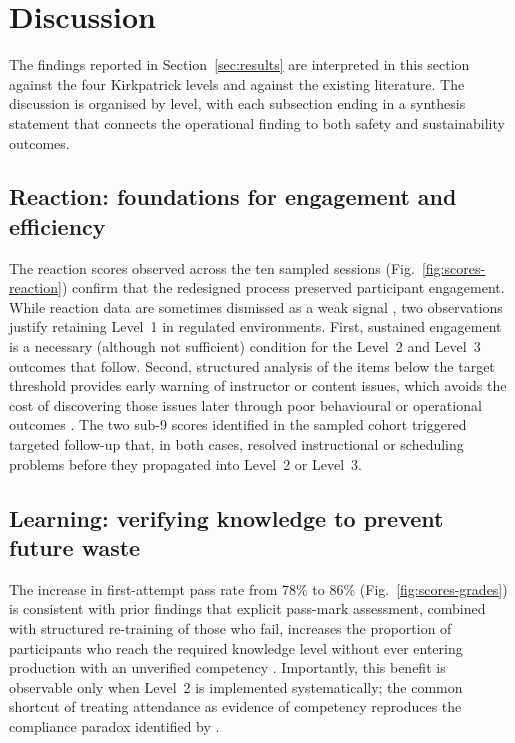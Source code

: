 \section{Discussion}
\label{sec:discussion}

The findings reported in Section~\ref{sec:results} are interpreted in this
section against the four Kirkpatrick levels and against the existing
literature. The discussion is organised by level, with each subsection
ending in a synthesis statement that connects the operational finding to
both safety and sustainability outcomes.

\subsection{Reaction: foundations for engagement and efficiency}
\label{subsec:disc-reaction}

The reaction scores observed across the ten sampled sessions
(Fig.~\ref{fig:scores-reaction}) confirm that the redesigned process
preserved participant engagement. While reaction data are sometimes dismissed
as a weak signal \citep{Patel2023}, two observations justify retaining
Level~1 in regulated environments. First, sustained engagement is a
necessary (although not sufficient) condition for the Level~2 and Level~3
outcomes that follow. Second, structured analysis of the items below the
target threshold provides early warning of instructor or content issues,
which avoids the cost of discovering those issues later through poor
behavioural or operational outcomes \citep{ORconnor2024}. The two
sub-9 scores identified in the sampled cohort triggered targeted follow-up
that, in both cases, resolved instructional or scheduling problems before
they propagated into Level~2 or Level~3.

\subsection{Learning: verifying knowledge to prevent future waste}
\label{subsec:disc-learning}

The increase in first-attempt pass rate from 78\% to 86\%
(Fig.~\ref{fig:scores-grades}) is consistent with prior findings that
explicit pass-mark assessment, combined with structured re-training of
those who fail, increases the proportion of participants who reach the
required knowledge level without ever entering production with an
unverified competency \citep{Nakamura2024,Garcia2024}. Importantly, this
benefit is observable only when Level~2 is implemented systematically; the
common shortcut of treating attendance as evidence of competency reproduces
the compliance paradox identified by \citet{Nakamura2024}.

